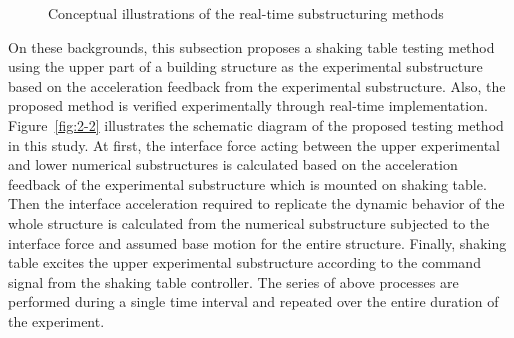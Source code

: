 \begin{figure}[ht]
\centering



\label{fig:2-1}
\caption{Conceptual illustrations of the real-time substructuring methods}
\end{figure}

On these backgrounds, this subsection proposes a shaking table testing method using the upper part of a building structure as the experimental substructure based on the acceleration feedback from the experimental substructure. Also, the proposed method is verified experimentally through real-time implementation. Figure~\ref{fig:2-2} illustrates the schematic diagram of the proposed testing method in this study. At first, the interface force acting between the upper experimental and lower numerical substructures is calculated based on the acceleration feedback of the experimental substructure which is mounted on shaking table. Then the interface acceleration required to replicate the dynamic behavior of the whole structure is calculated from the numerical substructure subjected to the interface force and assumed base motion for the entire structure. Finally, shaking table excites the upper experimental substructure according to the command signal from the shaking table controller. The series of above processes are performed during a single time interval and repeated over the entire duration of the experiment.

